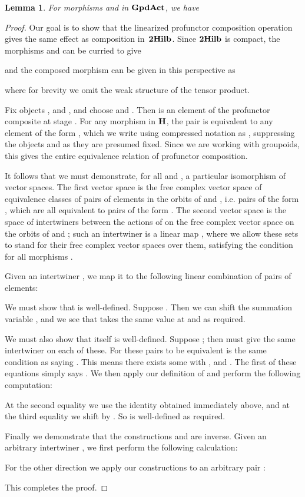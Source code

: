 \documentclass[a4paper,12pt]{article}
\newtheorem{lemma}[theorem]{Lemma}
\theoremstyle{definition}
\newcommand\cat[1]{{\ensuremath{\bf #1}}}
\renewcommand{\-}[0]{\nobreakdash-\hspace{0pt}}
\newcommand\GA{\cat{GpdAct}{}}
\begin{document}
\begin{lemma}
For morphisms  and  in \GA, we have

\end{lemma}
\begin{proof}
Our goal is to show that the linearized profunctor composition operation gives the same effect as composition in~\cat{2Hilb}. Since \cat{2Hilb} is compact, the morphisms  and  can be curried to give

and the composed morphism  can be given in this perspective as

where for brevity we omit the weak structure of the tensor product.

Fix objects ,  and , and choose  and . Then  is an element of the profunctor composite  at stage . For any morphism  in \cat H, the pair  is equivalent to any element of the form , which we write using compressed notation as , suppressing the objects  and  as they are presumed fixed. Since we are working with groupoids, this gives the entire equivalence relation of profunctor composition.

It follows that we must demonstrate, for all  and , a particular isomorphism of vector spaces. The first vector space is the free complex vector space of equivalence classes of pairs of elements in the orbits of  and , i.e. pairs of the form , which are all equivalent to pairs of the form . The second vector space is the space of intertwiners between the actions of  on the free complex vector space on the orbits of  and ; such an intertwiner is a linear map \mbox{}, where we allow these sets to stand for their free complex vector spaces over them, satisfying the condition  for all morphisms .

Given an intertwiner , we map it to the following linear combination  of pairs of elements:

We must show that   is well-defined. Suppose \mbox{}. Then we can shift the summation variable \mbox{}, and we see that  takes the same value at  and  as required.

We must also show that  itself is well-defined. Suppose ; then  must give the same intertwiner on each of these. For these pairs to be equivalent is the same condition as saying . This means there exists some  with , and . The first of these equations simply says . We then apply our definition of  and perform the following computation:

At the second equality we use the identity obtained immediately above, and at the third equality we shift  by . So  is well-defined as required.

Finally we demonstrate that the constructions  and  are inverse. Given an arbitrary intertwiner , we first perform the following calculation:

For the other direction we apply our constructions to an arbitrary pair :

This completes the proof.
\end{proof}
\end{document}
